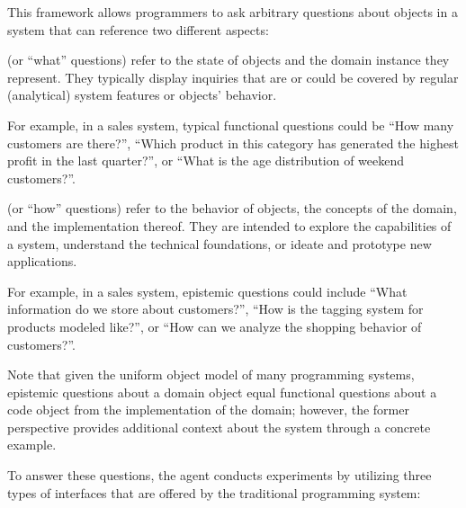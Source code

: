 This framework allows programmers to ask arbitrary questions about objects in a system that can reference two different aspects:

\begin{description}[noextralabelsep]
	\item[Functional questions] (or ``what'' questions) refer to the state of objects and the domain instance they represent.
	They typically display inquiries that are or could be covered by regular (analytical) system features or objects' behavior.

	For example, in a sales system, typical functional questions could be ``How many customers are there?'', ``Which product in this category has generated the highest profit in the last quarter?'', or ``What is the age distribution of weekend customers?''.

	\item[Epistemic questions] (or ``how'' questions) refer to the behavior of objects, the concepts of the domain, and the implementation thereof.
	They are intended to explore the capabilities of a system, understand the technical foundations, or ideate and prototype new applications.

	For example, in a sales system, epistemic questions could include ``What information do we store about customers?'', ``How is the tagging system for products modeled like?'', or ``How can we analyze the shopping behavior of customers?''.

	Note that given the uniform object model of many programming systems, epistemic questions about a domain object equal functional questions about a code object from the implementation of the domain; however, the former perspective provides additional context about the system through a concrete example.
\end{description}

To answer these questions, the agent conducts experiments by utilizing three types of interfaces that are offered by the traditional programming system:

